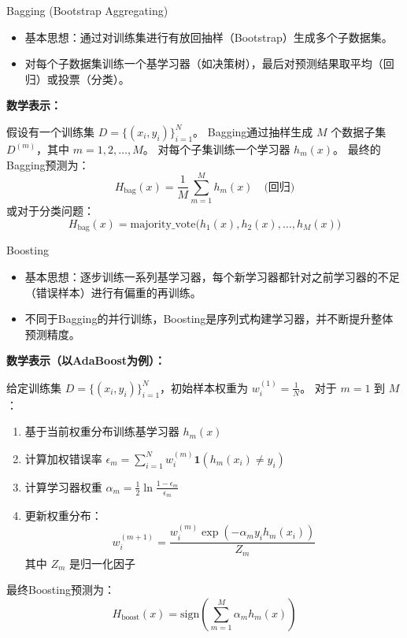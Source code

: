 \documentclass{beamer}
\begin{document}
\begin{frame}{Bagging (Bootstrap Aggregating)}
  \begin{itemize}
    \item 基本思想：通过对训练集进行有放回抽样（Bootstrap）生成多个子数据集。
    \item 对每个子数据集训练一个基学习器（如决策树），最后对预测结果取平均（回归）或投票（分类）。
  \end{itemize}

  \textbf{数学表示：}

  假设有一个训练集 $D = \{(x_i, y_i)\}_{i=1}^N$。  
  Bagging通过抽样生成 $M$ 个数据子集 $D^{(m)}$，其中 $m = 1, 2, \ldots, M$。  
  对每个子集训练一个学习器 $h_m(x)$。  
  最终的Bagging预测为：
  \[
  H_{\text{bag}}(x) = \frac{1}{M} \sum_{m=1}^M h_m(x) \quad \text{(回归)}
  \]
  或对于分类问题：
  \[
  H_{\text{bag}}(x) = \text{majority\_vote}\big(h_1(x), h_2(x), \ldots, h_M(x)\big)
  \]
\end{frame}

\begin{frame}{Boosting}
  \begin{itemize}
    \item 基本思想：逐步训练一系列基学习器，每个新学习器都针对之前学习器的不足（错误样本）进行有偏重的再训练。
    \item 不同于Bagging的并行训练，Boosting是序列式构建学习器，并不断提升整体预测精度。
  \end{itemize}

  \textbf{数学表示（以AdaBoost为例）：}

  给定训练集 $D = \{(x_i, y_i)\}_{i=1}^N$，初始样本权重为 $w_i^{(1)} = \frac{1}{N}$。  
  对于 $m = 1$ 到 $M$：
  \begin{enumerate}
    \item 基于当前权重分布训练基学习器 $h_m(x)$
    \item 计算加权错误率 $\epsilon_m = \sum_{i=1}^N w_i^{(m)} \mathbf{1}(h_m(x_i) \neq y_i)$
    \item 计算学习器权重 $\alpha_m = \frac{1}{2}\ln\frac{1-\epsilon_m}{\epsilon_m}$
    \item 更新权重分布：
    \[
    w_i^{(m+1)} = \frac{w_i^{(m)} \exp(-\alpha_m y_i h_m(x_i))}{Z_m}
    \]
    其中 $Z_m$ 是归一化因子
  \end{enumerate}

  最终Boosting预测为：
  \[
  H_{\text{boost}}(x) = \text{sign}\left(\sum_{m=1}^M \alpha_m h_m(x)\right)
  \]
\end{frame}
\end{document}
